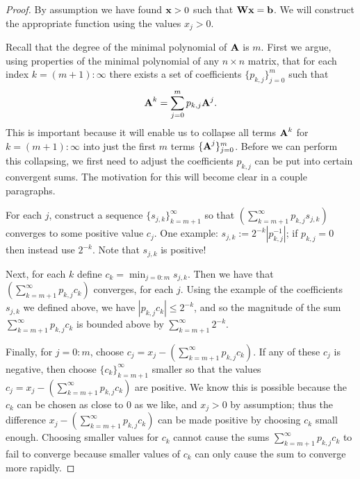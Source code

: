 \begin{proof}
By assumption we have found $\textbf{x} > 0 $ such that $\textbf{W}\textbf{x} =  \textbf{b}$. We will construct the appropriate function using the values $x_j > 0$.

Recall that the degree of the minimal polynomial of $\textbf{A}$ is $m$.
First we argue, using properties of the minimal polynomial of any $n\times n$ matrix, that for each index $k = (m+1) :\infty$ there exists a set of coefficients $\{ p_{k,j} \}_{j=0}^{m}$ such that
\[
\textbf{A}^k = \sum_{j=0}^{m} p_{k,j} \textbf{A}^j.
\]
This is important because it will enable us to collapse all terms $\textbf{A}^k$ for $k=(m+1):\infty$ into just the first $m$ terms $\{\textbf{A}^j\}_{j=0}^m$.
Before we can perform this collapsing, we first need to adjust the coefficients $p_{k,j}$ can be put into certain convergent sums. The motivation for this will become clear in a couple paragraphs.

For each $j$, construct a sequence $\{s_{j,k}\}_{k=m+1}^{\infty}$ so that $\left(\sum_{k=m+1}^{\infty} p_{k,j} s_{j,k} \right)$ converges to some positive value $c_j$. One example: $s_{j,k} := 2^{-k} |p_{k,j}^{-1}|$; if $p_{k,j} = 0$ then instead use $2^{-k}$. Note that $s_{j,k}$ is positive!

Next, for each $k$ define $c_k = \displaystyle \min_{j=0:m} s_{j,k}$. Then we have that $\left( \sum_{k=m+1}^{\infty} p_{k,j} c_k \right)$ converges, for each $j$. Using the example of the coefficients $s_{j,k}$ we defined above, we have $|p_{k,j}c_k| \leq 2^{-k}$, and so the magnitude of the sum $\sum_{k=m+1}^{\infty} p_{k,j} c_k$ is bounded above by $\sum_{k=m+1}^{\infty} 2^{-k}$.

Finally, for $j=0:m$, choose $c_j = x_j - \left( \sum_{k=m+1}^{\infty} p_{k,j} c_k \right)$. If any of these $c_j$ is negative, then choose $\{ c_k \}_{k=m+1}^{\infty}$ smaller so that the values $c_j = x_j - \left( \sum_{k=m+1}^{\infty} p_{k,j} c_k \right)$ are positive.
We know this is possible because the $c_k$ can be chosen as close to 0 as we like, and $x_j > 0$ by assumption; thus the difference $x_j - \left( \sum_{k=m+1}^{\infty} p_{k,j} c_k \right)$ can be made positive by choosing $c_k$ small enough.
Choosing smaller values for $c_k$ cannot cause the sums $\sum_{k=m+1}^{\infty} p_{k,j} c_k$ to fail to converge because smaller values of $c_k$ can only cause the sum to converge more rapidly.


\end{proof}
